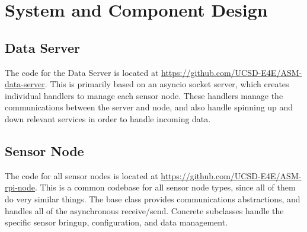 \documentclass{article}
\begin{document}
\section{System and Component Design}
\subsection{Data Server}
The code for the Data Server is located at \url{https://github.com/UCSD-E4E/ASM-data-server}.  This is primarily based on an asyncio socket server, which creates individual handlers to manage each sensor node.  These handlers manage the communications between the server and node, and also handle spinning up and down relevant services in order to handle incoming data.

\subsection{Sensor Node}
The code for all sensor nodes is located at \url{https://github.com/UCSD-E4E/ASM-rpi-node}.  This is a common codebase for all sensor node types, since all of them do very similar things.  The base class provides communications abstractions, and handles all of the asynchronous receive/send.  Concrete subclasses handle the specific sensor bringup, configuration, and data management.
\end{document}
